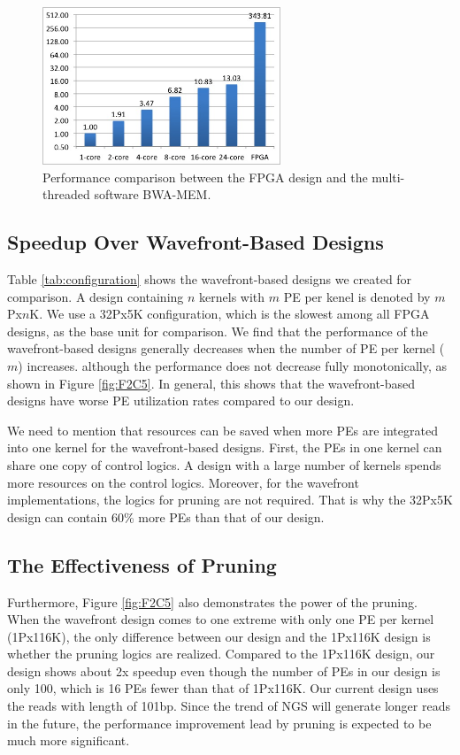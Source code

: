 \begin{figure}[!hbt]
	\begin{center}
		\includegraphics[width=2.8in]{Figures/F1C5.jpg}
		\caption {Performance comparison between the FPGA design and the multi-threaded software BWA-MEM.}
		\label{fig:F1C5}
	\end{center}
\end{figure}

\subsection{Speedup Over Wavefront-Based Designs}

Table \ref{tab:configuration} shows the wavefront-based designs we created for comparison. 
A design containing $n$ kernels with $m$ PE per kenel is denoted by $m$Px$n$K. 
We use a 32Px5K configuration, which is the slowest among all FPGA designs, as the base unit for comparison.
We find that the performance of the wavefront-based designs generally decreases when the number of PE per kernel ($m$) increases.
although the performance does not decrease fully monotonically, as shown in Figure \ref{fig:F2C5}.
In general, this shows that the wavefront-based designs have worse PE utilization rates compared to our design. 

We need to mention that resources can be saved when more PEs are integrated into one kernel for the wavefront-based designs.
First, the PEs in one kernel can share one copy of control logics. A design with a large number of kernels spends more resources on the control logics.
Moreover, for the wavefront implementations, the logics for pruning are not required.
That is why the 32Px5K design can contain 60\% more PEs than that of our design.



\subsection{The Effectiveness of Pruning}
Furthermore, Figure \ref{fig:F2C5} also demonstrates the power of the pruning. 
When the wavefront design comes to one extreme with only one PE per kernel (1Px116K), 
the only difference between our design and the 1Px116K design is whether the pruning logics are realized. 
Compared to the 1Px116K design, our design shows about 2x speedup even though the number of PEs in our design is only 100, which is 16 PEs fewer than that of 1Px116K. 
Our current design uses the reads with length of 101bp.
Since the trend of NGS will generate longer reads in the future, the performance improvement lead by pruning is expected to be much more significant.

